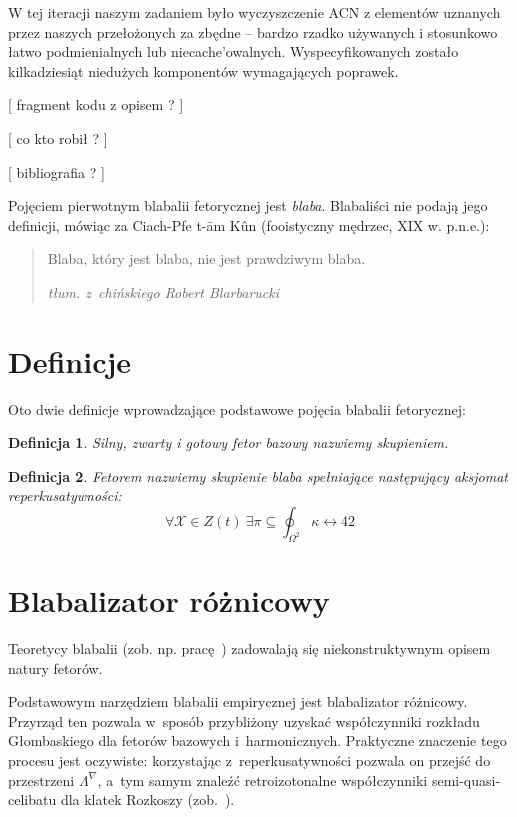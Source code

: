 \documentclass[licencjacka]{pracamgr}
\newtheorem{defi}{Definicja}[section]
\begin{document}
W tej iteracji naszym zadaniem było wyczyszczenie ACN z elementów uznanych przez naszych przełożonych za zbędne – bardzo rzadko używanych i stosunkowo łatwo podmienialnych lub niecache’owalnych. Wyspecyfikowanych zostało kilkadziesiąt niedużych komponentów wymagających poprawek.

[ fragment kodu z opisem ? ]

[ co kto robił ? ]

[ bibliografia ? ]







Pojęciem pierwotnym blabalii fetorycznej jest \emph{blaba}.
Blabaliści nie podają jego definicji, mówiąc za Ciach-Pfe t-\=am
K\^un (fooistyczny mędrzec, XIX w. p.n.e.):
\begin{quote}
  Blaba, który jest blaba, nie jest prawdziwym blaba.

\raggedleft\slshape tłum. z~chińskiego Robert Blarbarucki
\end{quote}

\section{Definicje}

Oto dwie definicje wprowadzające podstawowe pojęcia blabalii
fetorycznej:

\begin{defi}\label{skupienie}
  Silny, zwarty i gotowy fetor bazowy nazwiemy \emph{skupieniem}.
\end{defi}

\begin{defi}\label{fetor}
  \emph{Fetorem} nazwiemy skupienie blaba spełniające następujący
  \emph{aksjomat reperkusatywności}:
  $$\forall \mathcal{X}\in Z(t)\ \exists
  \pi\subseteq\oint_{\Omega^2}\kappa\leftrightarrow 42$$
\end{defi}


\section{Blabalizator różnicowy}

Teoretycy blabalii (zob. np. pracę~\cite{grglo}) zadowalają się
niekonstruktywnym opisem natury fetorów.

Podstawowym narzędziem blabalii empirycznej jest blabalizator
różnicowy.  Przyrząd ten pozwala w~sposób przybliżony uzyskać
współczynniki rozkładu Głombaskiego dla fetorów bazowych
i~harmonicznych.  Praktyczne znaczenie tego procesu jest oczywiste:
korzystając z~reperkusatywności pozwala on przejść do przestrzeni
$\Lambda^{\nabla}$, a~tym samym znaleźć retroizotonalne współczynniki
semi-quasi-celibatu dla klatek Rozkoszy (zob.~\cite{JR}).
\end{document}
